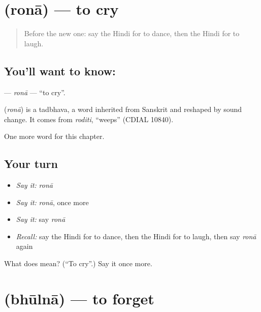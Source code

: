 \section[\texorpdfstring{\hi{रोना} (ronā)}{रोना (ronā)}]{ (ronā) — to cry}

\label{lesson:HI-C162-rona}



\begin{quote}
Before the new one: say the Hindi for to dance, then the Hindi for to laugh.
\end{quote}

\subsection*{You'll want to know: }
\textbf{} — \emph{ronā} — \textquotedblleft{}to cry\textquotedblright{}.

\begin{cousinweb}
\textbf{} (\emph{ronā}) is a tadbhava, a word inherited from Sanskrit and reshaped by sound change. It comes from \emph{roditi}, \textquotedblleft{}weeps\textquotedblright{} (CDIAL 10840).
\end{cousinweb}

\begin{grammarlens}[title={What you've built}]
One more word for this chapter.
\end{grammarlens}

\subsection*{Your turn}
\begin{itemize}
\raggedright
  \item \emph{Say it:} \emph{ronā}
  \item \emph{Say it:} \emph{ronā}, once more
  \item \emph{Say it:} say \emph{ronā}
  \item \emph{Recall:} say the Hindi for to dance, then the Hindi for to laugh, then say \emph{ronā} again
\end{itemize}

\begin{tcolorbox}[breakable,colback=teal!4,colframe=teal!35!black,title={Before you move on}]
What does  mean? (\textquotedblleft{}To cry\textquotedblright{}.) Say it once more.
\end{tcolorbox}
\section[\texorpdfstring{\hi{भूलना} (bhūlnā)}{भूलना (bhūlnā)}]{ (bhūlnā) — to forget}

